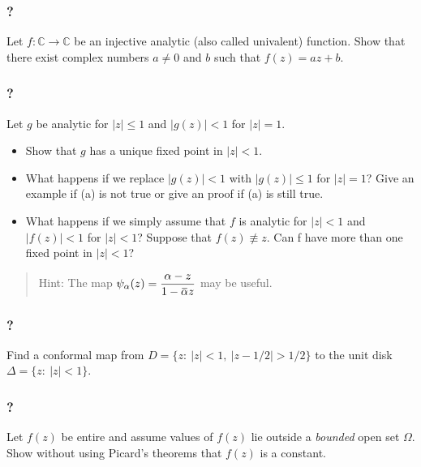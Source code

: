 \hypertarget{section-116}{%
\subsubsection{?}\label{section-116}}

Let \(f: {\mathbb C} \rightarrow {\mathbb C}\) be an injective analytic
(also called univalent) function. Show that there exist complex numbers
\(a \neq 0\) and \(b\) such that \(f(z) = az + b\).

\hypertarget{section-117}{%
\subsubsection{?}\label{section-117}}

Let \(g\) be analytic for \(|z|\leq 1\) and \(|g(z)| < 1\) for
\(|z| = 1\).

\begin{itemize}
\item
  Show that \(g\) has a unique fixed point in \(|z| < 1\).
\item
  What happens if we replace \(|g(z)| < 1\) with \(|g(z)|\leq 1\) for
  \(|z|=1\)? Give an example if (a) is not true or give an proof if (a)
  is still true.
\item
  What happens if we simply assume that \(f\) is analytic for
  \(|z| < 1\) and \(|f(z)| < 1\) for \(|z| < 1\)? Suppose that
  \(f(z) \not\equiv z\). Can f have more than one fixed point in
  \(|z| < 1\)?
\end{itemize}

\begin{quote}
Hint: The map
\(\displaystyle{\psi_{\alpha}(z)=\frac{\alpha-z}{1-\mkern 1.5mu\overline{\mkern-1.5mu\alpha\mkern-1.5mu}\mkern 1.5muz}}\)
may be useful.
\end{quote}

\hypertarget{section-118}{%
\subsubsection{?}\label{section-118}}

Find a conformal map from \(D = \{z :\  |z| < 1,\ |z - 1/2| > 1/2\}\) to
the unit disk \(\Delta=\{z: \ |z|<1\}\).

\hypertarget{section-119}{%
\subsubsection{?}\label{section-119}}

Let \(f(z)\) be entire and assume values of \(f(z)\) lie outside a
\emph{bounded} open set \(\Omega\). Show without using Picard's theorems
that \(f(z)\) is a constant.

